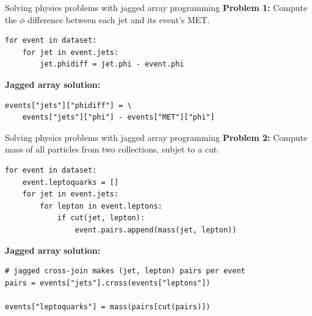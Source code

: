\documentclass[aspectratio=169]{beamer}
\begin{document}
\begin{frame}[fragile]{Solving physics problems with jagged array programming}
\vspace{0.5 cm}
{\bf Problem 1:} Compute the $\phi$ difference between each jet and its event's MET.
\small
\begin{verbatim}
for event in dataset:
    for jet in event.jets:
        jet.phidiff = jet.phi - event.phi
\end{verbatim}
\normalsize

\vspace{0.5 cm}
{\bf Jagged array solution:} 
\small
\begin{verbatim}
events["jets"]["phidiff"] = \
    events["jets"]["phi"] - events["MET"]["phi"]
\end{verbatim}
\end{frame}

\begin{frame}[fragile]{Solving physics problems with jagged array programming}
\vspace{0.5 cm}
{\bf Problem 2:} Compute mass of all particles from two collections, subjet to a cut.
\small
\begin{verbatim}
for event in dataset:
    event.leptoquarks = []
    for jet in event.jets:
        for lepton in event.leptons:
            if cut(jet, lepton):
                event.pairs.append(mass(jet, lepton))
\end{verbatim}
\normalsize

\vspace{0.5 cm}
{\bf Jagged array solution:} 
\small
\begin{verbatim}
# jagged cross-join makes (jet, lepton) pairs per event
pairs = events["jets"].cross(events["leptons"])

events["leptoquarks"] = mass(pairs[cut(pairs)])
\end{verbatim}
\end{frame}
\end{document}
